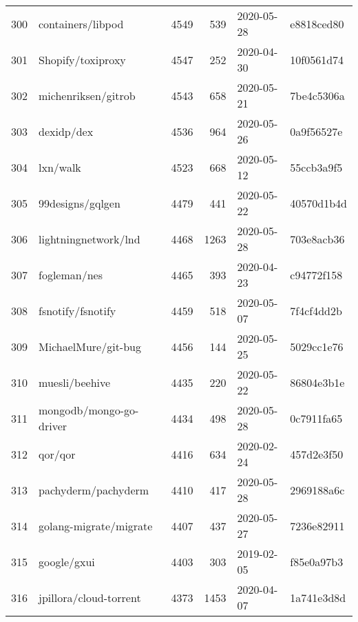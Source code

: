 \begin{footnotesize}
\begin{longtable}{llrrll}
        300 &                                  containers/libpod &   4549 &    539 & 2020-05-28 &  e8818ced80 \\
        301 &                                  Shopify/toxiproxy &   4547 &    252 & 2020-04-30 &  10f0561d74 \\
        302 &                                michenriksen/gitrob &   4543 &    658 & 2020-05-21 &  7be4c5306a \\
        303 &                                         dexidp/dex &   4536 &    964 & 2020-05-26 &  0a9f56527e \\
        304 &                                           lxn/walk &   4523 &    668 & 2020-05-12 &  55ccb3a9f5 \\
        305 &                                   99designs/gqlgen &   4479 &    441 & 2020-05-22 &  40570d1b4d \\
        306 &                               lightningnetwork/lnd &   4468 &   1263 & 2020-05-28 &  703e8acb36 \\
        307 &                                       fogleman/nes &   4465 &    393 & 2020-04-23 &  c94772f158 \\
        308 &                                  fsnotify/fsnotify &   4459 &    518 & 2020-05-07 &  7f4cf4dd2b \\
        309 &                                MichaelMure/git-bug &   4456 &    144 & 2020-05-25 &  5029cc1e76 \\
        310 &                                     muesli/beehive &   4435 &    220 & 2020-05-22 &  86804e3b1e \\
        311 &                            mongodb/mongo-go-driver &   4434 &    498 & 2020-05-28 &  0c7911fa65 \\
        312 &                                            qor/qor &   4416 &    634 & 2020-02-24 &  457d2e3f50 \\
        313 &                                pachyderm/pachyderm &   4410 &    417 & 2020-05-28 &  2969188a6c \\
        314 &                             golang-migrate/migrate &   4407 &    437 & 2020-05-27 &  7236e82911 \\
        315 &                                        google/gxui &   4403 &    303 & 2019-02-05 &  f85e0a97b3 \\
        316 &                             jpillora/cloud-torrent &   4373 &   1453 & 2020-04-07 &  1a741e3d8d \\

\end{longtable}
\end{footnotesize}
